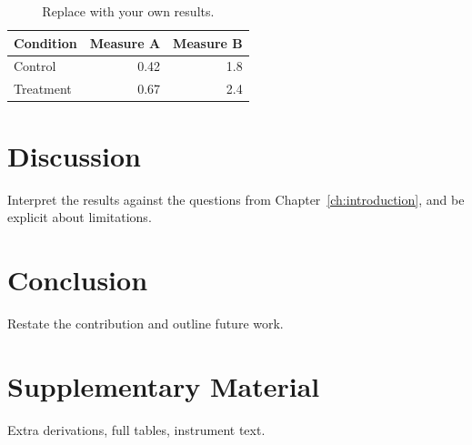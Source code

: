 \documentclass[12pt,a4paper,oneside]{report}
\begin{document}
\begin{table}[ht]
  \centering
  \begin{tabular}{lrr}
    \toprule
    Condition & Measure A & Measure B \\
    \midrule
    Control   & 0.42      & 1.8       \\
    Treatment & 0.67      & 2.4       \\
    \bottomrule
  \end{tabular}
  \caption{Replace with your own results.}
  \label{tab:results}
\end{table}

\chapter{Discussion}
\label{ch:discussion}

Interpret the results against the questions from
Chapter~\ref{ch:introduction}, and be explicit about limitations.

\chapter{Conclusion}
\label{ch:conclusion}

Restate the contribution and outline future work.

\appendix
\chapter{Supplementary Material}
\label{app:supplementary}

Extra derivations, full tables, instrument text.



\end{document}
